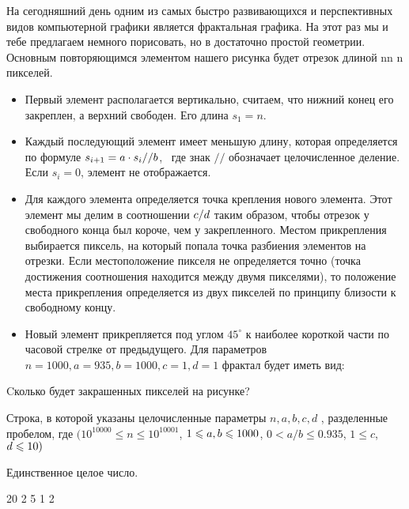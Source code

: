 
На сегодняшний день одним из самых быстро развивающихся и перспективных видов компьютерной графики является фрактальная графика. 
На этот раз мы и тебе предлагаем немного порисовать, но в достаточно простой геометрии. Основным повторяющимся элементом нашего 
рисунка будет отрезок длиной nn n  пикселей. 
\begin{itemize}
    \item Первый элемент располагается вертикально, считаем, что нижний конец его закреплен, 
    а верхний свободен. Его длина $s_1 = n$. 
    \item Каждый последующий элемент имеет меньшую длину, которая определяется по формуле 
    $s_{i+1}=a \cdot s_i \space // \space b$,  где знак $//$ обозначает целочисленное деление. Если $s_i = 0$, элемент не отображается.
    \item Для каждого элемента определяется точка крепления нового элемента. Этот элемент мы 
    делим в соотношении $c \space / \space d$ таким образом, чтобы отрезок у свободного конца был короче, чем у закрепленного. 
    Местом прикрепления выбирается пиксель, на который попала точка разбиения элементов на отрезки. Если 
    местоположение пикселя не определяется точно (точка достижения соотношения находится между двумя пикселями), 
    то положение места прикрепления определяется из двух пикселей по принципу близости к свободному концу.
    \item Новый элемент прикрепляется под углом $45^{\circ}$ к наиболее короткой части по часовой стрелке от 
    предыдущего. Для параметров $n = 1000, a = 935, b = 1000, c = 1, d = 1$  фрактал будет иметь вид:
\end{itemize}


Cколько будет закрашенных пикселей на рисунке?


Строка, в которой указаны целочисленные параметры $n, a, b, c, d$ , разделенные пробелом, где 
$(10^{10000} \leq n \leq 10^{10001}$, $1 \leq a,\space b \leq 1000$, $0 < a/b \leq  0.935$, 
$1 \leq c$, $\space d \leq 10 )$

\outputfmtSection

Единственное целое число.


\begin{myverbbox}[\small]{\vinput}
    20 2 5 1 2
\end{myverbbox}

